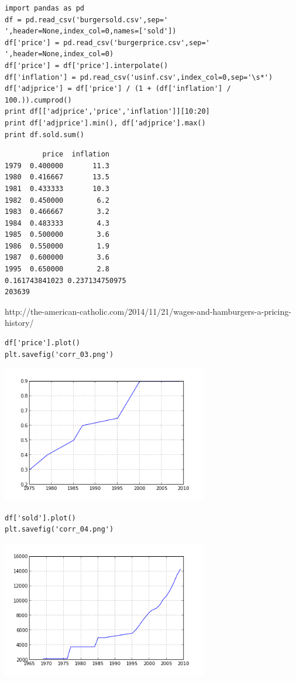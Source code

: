 \documentclass[12pt,fleqn]{article}\usepackage{../common}
\begin{document}
\begin{verbatim}
import pandas as pd
df = pd.read_csv('burgersold.csv',sep=' ',header=None,index_col=0,names=['sold'])
df['price'] = pd.read_csv('burgerprice.csv',sep=' ',header=None,index_col=0)
df['price'] = df['price'].interpolate()
df['inflation'] = pd.read_csv('usinf.csv',index_col=0,sep='\s*')
df['adjprice'] = df['price'] / (1 + (df['inflation'] / 100.)).cumprod()
print df[['adjprice','price','inflation']][10:20]
print df['adjprice'].min(), df['adjprice'].max()
print df.sold.sum()
\end{verbatim}

\begin{verbatim}
         price  inflation
1979  0.400000       11.3
1980  0.416667       13.5
1981  0.433333       10.3
1982  0.450000        6.2
1983  0.466667        3.2
1984  0.483333        4.3
1985  0.500000        3.6
1986  0.550000        1.9
1987  0.600000        3.6
1995  0.650000        2.8
0.161743841023 0.237134750975
203639
\end{verbatim}

http://the-american-catholic.com/2014/11/21/wages-and-hamburgers-a-pricing-history/

\begin{verbatim}
df['price'].plot()
plt.savefig('corr_03.png')
\end{verbatim}

\includegraphics[height=6cm]{corr_03.png}


\begin{verbatim}
df['sold'].plot()
plt.savefig('corr_04.png')
\end{verbatim}

\includegraphics[height=6cm]{corr_04.png}
\end{document}

